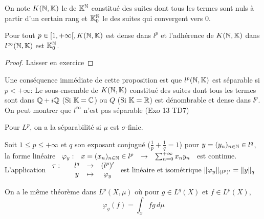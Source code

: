 \documentclass[]{report}
\begin{document}
    On note $K(\mathbb{N},\mathbb{K})$ le \sev de $\mathbb{K}^{\mathbb{N}}$ constitué des suites dont tous les termes sont nuls à partir d'un certain rang et $\mathbb{K}_0^{\mathbb{N}}$ le \sev des suites qui convergent vers $0$.

    \begin{prop}{}{}
        Pour tout $p\in [1,+\infty[,K(\mathbb{N},\mathbb{K})$ est dense dans $l^p$ et l'adhérence de $K(\mathbb{N},\mathbb{K})$ dans $l^\infty(\mathbb{N},\mathbb{K})$ est $\mathbb{K}_0^{\mathbb{N}}$.
    \end{prop}

    \begin{proof}
        Laisser en exercice
    \end{proof}

    \begin{re}{}{}
        Une conséquence immédiate de cette proposition est que $l^p(\mathbb{N},\mathbb{K})$ est séparable si $p<+\infty$: Le sous-ensemble de $K(\mathbb{N},\mathbb{K})$ constitué des suites dont tous les termes sont dans $\mathbb{Q}+i \mathbb{Q}$ (Si $\mathbb{K}=\mathbb{C}$) ou $Q$ (Si $\mathbb{K}=\mathbb{R}$) est dénombrable et dense dans $l^p$.\\
        On peut montrer que $l^\infty$ n'est pas séparable (Exo 13 TD7)
    \end{re}

    \begin{re}{}{}
        Pour $L^p$, on a la séparabilité si $\mu$ est $\sigma$-finie.
    \end{re}

    \begin{prop}{}{}
        Soit $1\le p\le +\infty$ et $q$ son exposant conjugué ($\frac{1}{p}+\frac{1}{q}=1$) pour $y=(y_n)_{n\in\mathbb{N}}\in l^q$, la forme linéaire $\begin{array}{ccccc} \varphi_y : & x=(x_n)_{n\in\mathbb{N}}\in l^p & \to & \sum_{n=0}^{+\infty}x_n y_n \end{array}$ est continue.\\
        L'application $\begin{array}{ccccc} \tau : & & l^q & \to & (l^p)' \\ & & y & \mapsto & \varphi_y \end{array}$ est linéaire et isométrique $\lVert \varphi_y \rVert_{(l^p)'}=\lVert y \rVert_q$
    \end{prop}

    \begin{re}{}{}
        On a le même théorème dans $L^p(X,\mu)$ où pour $g\in L^q(X)$ et $f\in L^p(X)$,
        \[\varphi_g(f)=\int_x fg\, d\mu\]
    \end{re}
\end{document}
